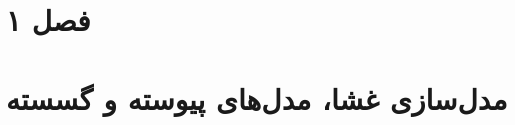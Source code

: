 \documentclass[a4paper,12pt]{book}
\begin{document}
\doublespacing
\cleardoublepage
{} 







\tableofcontents
\clearpage
\listoffigures

\def \Mempath {Chapters/Membrane}

\clearpage

\clearpage
{} 
\chapter{
}

\chapter{
}

\chapter{
}


%
\chapter{فصل ۱}

\clearpage
\chapter{
مدل‌سازی غشا، مدل‌های پیوسته و گسسته
}




\unsetRL
 



\end{document}
